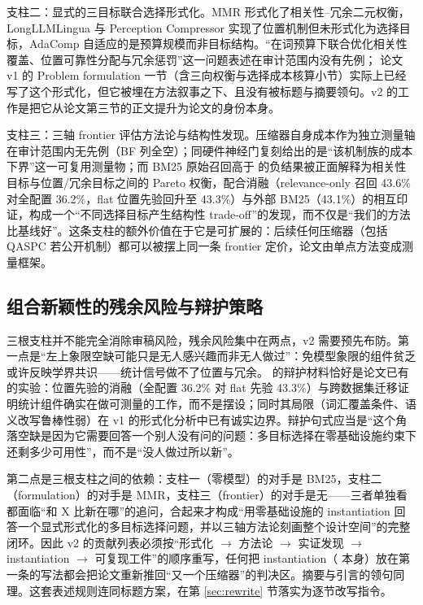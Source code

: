 支柱二：显式的三目标联合选择形式化。MMR 形式化了相关性--冗余二元权衡，LongLLMLingua 与 Perception Compressor 实现了位置机制但未形式化为选择目标，AdaComp 自适应的是预算规模而非目标结构。``在词预算下联合优化相关性覆盖、位置可靠性分配与冗余惩罚''这一问题表述在审计范围内没有先例；\sieve{} 论文 v1 的 Problem formulation 一节（含三向权衡与选择成本核算小节）实际上已经写了这个形式化，但它被埋在方法叙事之下、且没有被标题与摘要领句。v2 的工作是把它从论文第三节的正文提升为论文的身份本身。

支柱三：三轴 frontier 评估方法论与结构性发现。压缩器自身成本作为独立测量轴在审计范围内无先例（BF 列全空）；同硬件神经门复刻给出的是``该机制族的成本下界''这一可复用测量物；而 BM25 原始召回高于 \sieve{} 的负结果被正面解释为相关性目标与位置/冗余目标之间的 Pareto 权衡，配合消融（relevance-only 召回 43.6\% 对全配置 36.2\%，flat 位置先验回升至 43.3\%）与外部 BM25（43.1\%）的相互印证，构成一个``不同选择目标产生结构性 trade-off''的发现，而不仅是``我们的方法比基线好''。这条支柱的额外价值在于它是可扩展的：后续任何压缩器（包括 QASPC 若公开机制）都可以被摆上同一条 frontier 定价，论文由单点方法变成测量框架。

\subsection{组合新颖性的残余风险与辩护策略}

三根支柱并不能完全消除审稿风险，残余风险集中在两点，v2 需要预先布防。第一点是``左上象限空缺可能只是无人感兴趣而非无人做过''：免模型象限的组件贫乏或许反映学界共识——统计信号做不了位置与冗余。\sieve{} 的辩护材料恰好是论文已有的实验：位置先验的消融（全配置 36.2\% 对 flat 先验 43.3\%）与跨数据集迁移证明统计组件确实在做可测量的工作，而不是摆设；同时其局限（词汇覆盖条件、语义改写鲁棒性弱）在 v1 的形式化分析中已有诚实边界。辩护句式应当是``这个角落空缺是因为它需要回答一个别人没有问的问题：多目标选择在零基础设施约束下还剩多少可用性''，而不是``没人做过所以新''。

第二点是三根支柱之间的依赖：支柱一（零模型）的对手是 BM25，支柱二（formulation）的对手是 MMR，支柱三（frontier）的对手是无——三者单独看都面临``和 X 比新在哪''的追问，合起来才构成``用零基础设施的 instantiation 回答一个显式形式化的多目标选择问题，并以三轴方法论刻画整个设计空间''的完整闭环。因此 v2 的贡献列表必须按``形式化 $\rightarrow$ 方法论 $\rightarrow$ 实证发现 $\rightarrow$ instantiation $\rightarrow$ 可复现工件''的顺序重写，任何把 instantiation（\sieve{} 本身）放在第一条的写法都会把论文重新推回``又一个压缩器''的判决区。摘要与引言的领句同理。这套表述规则连同标题方案，在第 \ref{sec:rewrite} 节落实为逐节改写指令。
